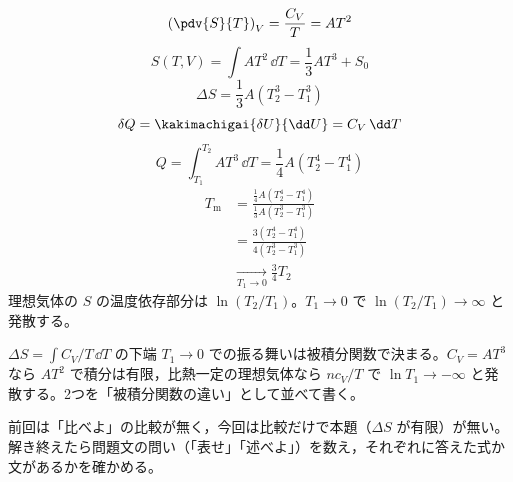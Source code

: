 \[ \left(\pdv{S}{T}\right)_{V}=\frac{C_{V}}{T}=AT^{2} \]
\[ S(T,V)=\int AT^{2}\,\dd T=\frac{1}{3}AT^{3}+S_{0} \]
\[ \Delta S=\frac{1}{3}A\left(T_{2}^{3}-T_{1}^{3}\right) \]
\[ \delta Q=\kakimachigai{\delta U}{\dd U}=C_{V}\,\dd T \]
\[ Q=\int_{T_{1}}^{T_{2}}AT^{3}\,\dd T=\frac{1}{4}A\left(T_{2}^{4}-T_{1}^{4}\right) \]
\begin{align*}
T_{\mathrm{m}}&=\frac{\frac{1}{4}A(T_{2}^{4}-T_{1}^{4})}{\frac{1}{3}A(T_{2}^{3}-T_{1}^{3})}\\
&=\frac{3(T_{2}^{4}-T_{1}^{4})}{4(T_{2}^{3}-T_{1}^{3})}\\
&\xrightarrow[T_{1}\to0]{}\frac{3}{4}T_{2}
\end{align*}
理想気体の $S$ の温度依存部分は $\ln(T_{2}/T_{1})$。$T_{1}\to0$ で $\ln(T_{2}/T_{1})\to\infty$ と発散する。
\item $\Delta S=\int C_{V}/T\,\dd T$ の下端 $T_{1}\to0$ での振る舞いは被積分関数で決まる。$C_{V}=AT^{3}$ なら $AT^{2}$ で積分は有限，比熱一定の理想気体なら $nc_{V}/T$ で $\ln T_{1}\to-\infty$ と発散する。2つを「被積分関数の違い」として並べて書く。
\item {} 前回は「比べよ」の比較が無く，今回は比較だけで本題（$\Delta S$ が有限）が無い。解き終えたら問題文の問い（「表せ」「述べよ」）を数え，それぞれに答えた式か文があるかを確かめる。
